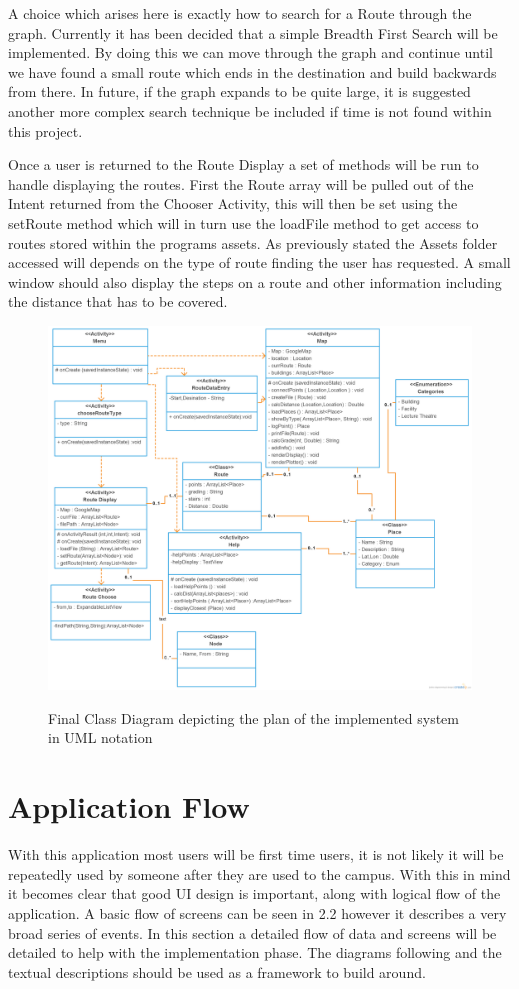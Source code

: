 A choice which arises here is exactly how to search for a Route through the graph. Currently it has been decided that a simple Breadth First Search will be implemented. By doing this we can move through the graph and continue until we have found a small route which ends in the destination and build backwards from there. In future, if the graph expands to be quite large, it is suggested another more complex search technique be included if time is not found within this project. 

Once a user is returned to the Route Display a set of methods will be run to handle displaying the routes. First the Route array will be pulled out of the Intent returned from the Chooser Activity, this will then be set using the setRoute method which will in turn use the loadFile method to get access to routes stored within the programs assets. As previously stated the Assets folder accessed will depends on the type of route finding the user has requested. A small window should also display the steps on a route and other information including the distance that has to be covered. 


\begin{figure}
\includegraphics[scale=0.25]{Chapter2/class.png} \\
\caption[Class Diagram]{Final Class Diagram depicting the plan of the implemented system in UML notation}
\end{figure}
\newpage
\section{Application Flow}
With this application most users will be first time users, it is not likely it will be repeatedly used by someone after they are used to the campus. With this in mind it becomes clear that good UI design is important, along with logical flow of the application. A basic flow of screens can be seen in 2.2 however it describes a very broad series of events. In this section a detailed flow of data and screens will be detailed to help with the implementation phase. The diagrams following and the textual descriptions should be used as a framework to build around. 
